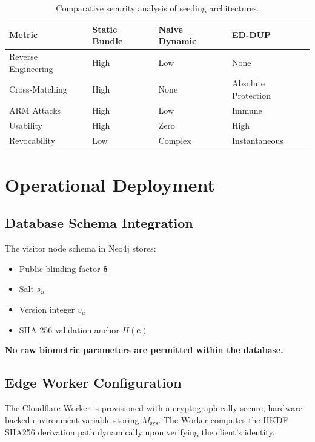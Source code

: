 \documentclass[11pt,twoside]{amsart}
\theoremstyle{plain}
\theoremstyle{definition}
\theoremstyle{remark}
\newcommand{\bc}{\mathbf{c}}
\newcommand{\bdelta}{\boldsymbol{\delta}}
\begin{document}
\begin{table}[htbp]
\centering
\caption{Comparative security analysis of seeding architectures.}
\label{tab:security}
\begin{tabular}{@{}p{2.8cm}p{3cm}p{3cm}p{3.5cm}@{}}
\toprule
\textbf{Metric} & \textbf{Static Bundle} & \textbf{Naive Dynamic} & \textbf{ED-DUP} \\
\midrule
Reverse Engineering & High & Low & None \\
Cross-Matching & High & None & Absolute Protection \\
ARM Attacks & High & Low & Immune \\
Usability & High & Zero & High \\
Revocability & Low & Complex & Instantaneous \\
\bottomrule
\end{tabular}
\end{table}

\section{Operational Deployment}

\subsection{Database Schema Integration}

The visitor node schema in Neo4j stores:
\begin{itemize}
    \item Public blinding factor $\bdelta$
    \item Salt $s_u$
    \item Version integer $v_u$
    \item SHA-256 validation anchor $H(\bc)$
\end{itemize}

\textbf{No raw biometric parameters are permitted within the database.}

\subsection{Edge Worker Configuration}

The Cloudflare Worker is provisioned with a cryptographically secure, hardware-backed environment variable storing $M_{\text{sys}}$. The Worker computes the HKDF-SHA256 derivation path dynamically upon verifying the client's identity.
\end{document}

